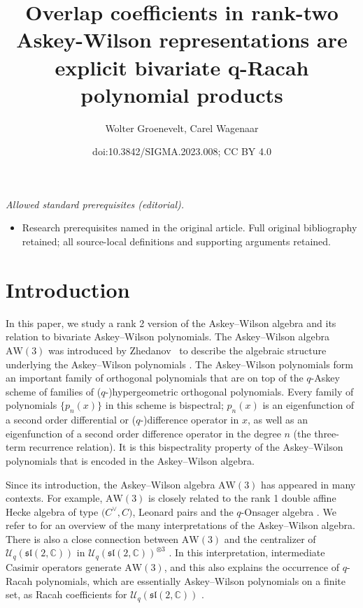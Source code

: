 \documentclass[10pt,a4paper]{amsart}
\title{Overlap coefficients in rank-two Askey-Wilson representations are explicit bivariate q-Racah polynomial products}
\author{Wolter Groenevelt, Carel Wagenaar}
\date{doi:10.3842/SIGMA.2023.008; CC BY 4.0}
\numberwithin{equation}{section}
\newcommand{\CC}{\mathbb{C}}
\newcommand{\aw}{\mathrm{AW}\!\left(3\right)}
\newcommand{\slc}{\mathfrak{sl}(2,\CC)}
\newcommand{\Uq}{\mathcal{U}_q}
\begin{document}
\maketitle
\noindent\textit{Allowed standard prerequisites (editorial).}\begin{itemize}
\item Research prerequisites named in the original article. Full original bibliography retained; all source-local definitions and supporting arguments retained.
\end{itemize}\medskip
\section{Introduction}	
In this paper, we study a rank 2 version of the Askey--Wilson algebra and its relation to bivariate Askey--Wilson polynomials. The Askey--Wilson algebra $\aw$ was introduced by Zhedanov~\cite{Zhedanov1991} to describe the algebraic structure underlying the Askey--Wilson polynomials \cite{AW1985}. The Askey--Wilson polynomials form an important family of orthogonal polynomials that are on top of the $q$-Askey scheme \cite{KLS} of families of ($q$-)hypergeometric orthogonal polynomials. Every family of polynomials $\{p_n(x)\}$ in this scheme is bispectral; $p_n(x)$ is an eigenfunction of a second order differential or ($q$-)difference operator in $x$, as well as an eigenfunction of a second order difference operator in the degree $n$ (the three-term recurrence relation). It is this bispectrality property of the Askey--Wilson polynomials that is encoded in the Askey--Wilson algebra.

Since its introduction, the Askey--Wilson algebra $\aw$ has appeared in many contexts. For example, $\aw$ is closely related to the rank 1 double affine Hecke algebra of type $\big(C^\vee,C\big)$, Leonard pairs and the $q$-Onsager algebra \cite{BVZ2017, Koornwinder2007, Koornwinder2008, Terwilliger2002, Terwilliger2013,Terwilliger2018}. We refer to \cite{CFGPRV2021} for an overview of the many interpretations of the Askey--Wilson algebra. There is also a close connection between $\aw$ and the centralizer of $\Uq(\slc)$ in $\Uq(\slc)^{\otimes3}$ \cite{CGVZ,GZ93,Huang2017}. In this interpretation, intermediate Casimir operators generate $\aw$, and this also explains the occurrence of $q$-Racah polynomials, which are essentially Askey--Wilson polynomials on a finite set, as Racah coefficients for $\Uq(\slc)$ \cite{Granovskii1993}.
\end{document}
